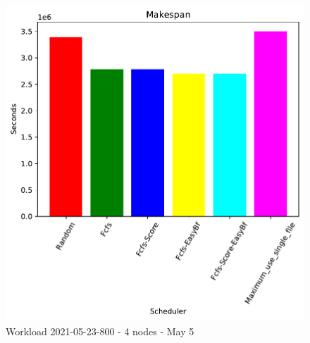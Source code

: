 \documentclass[a4paper]{article}
\begin{document}
\begin{figure}[H]
	\begin{minipage}[b]{0.5\linewidth}\centering\includegraphics[width=1\linewidth]{MBSS/plot/2021-05-23-800_Makespan4nodes.pdf}\caption{Makespan}\vspace{4ex}\end{minipage}\caption{Workload 2021-05-23-800 - 4 nodes - May 5}\end{figure}
\end{document}
